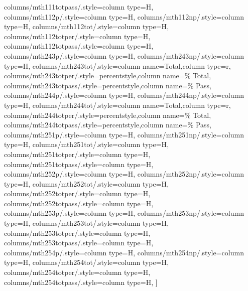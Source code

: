 \documentclass[varwidth]{standalone}
\begin{document}
{    columns/mth111totpass/.style={column type=H},
    columns/mth112p/.style={column type=H},
    columns/mth112np/.style={column type=H},
    columns/mth112tot/.style={column type=H},
    columns/mth112totper/.style={column type=H},
    columns/mth112totpass/.style={column type=H},
    columns/mth243p/.style={column type=H},
    columns/mth243np/.style={column type=H},
    columns/mth243tot/.style={column name=Total,column type=r},
    columns/mth243totper/.style={percentstyle,column name=\% Total},
    columns/mth243totpass/.style={percentstyle,column name=\% Pass},
    columns/mth244p/.style={column type=H},
    columns/mth244np/.style={column type=H},
    columns/mth244tot/.style={column name=Total,column type=r},
    columns/mth244totper/.style={percentstyle,column name=\% Total},
    columns/mth244totpass/.style={percentstyle,column name=\% Pass},
    columns/mth251p/.style={column type=H},
    columns/mth251np/.style={column type=H},
    columns/mth251tot/.style={column type=H},
    columns/mth251totper/.style={column type=H},
    columns/mth251totpass/.style={column type=H},
    columns/mth252p/.style={column type=H},
    columns/mth252np/.style={column type=H},
    columns/mth252tot/.style={column type=H},
    columns/mth252totper/.style={column type=H},
    columns/mth252totpass/.style={column type=H},
    columns/mth253p/.style={column type=H},
    columns/mth253np/.style={column type=H},
    columns/mth253tot/.style={column type=H},
    columns/mth253totper/.style={column type=H},
    columns/mth253totpass/.style={column type=H},
    columns/mth254p/.style={column type=H},
    columns/mth254np/.style={column type=H},
    columns/mth254tot/.style={column type=H},
    columns/mth254totper/.style={column type=H},
    columns/mth254totpass/.style={column type=H},
]{\diversitydata}
}
\end{document}
